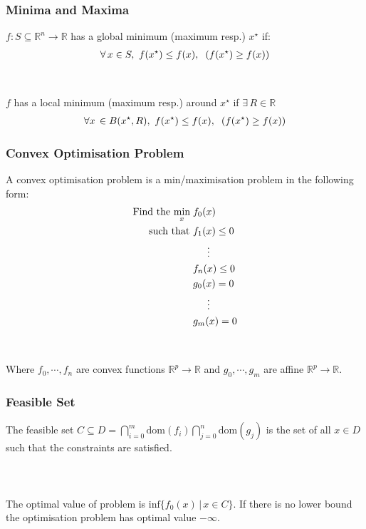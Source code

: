 \documentclass{beamer}
\def\rnum{\mathbb{R}}
\begin{document}
\begin{frame}
    \frametitle{Minima and Maxima}
    $f: S \subseteq \rnum^{n} \rightarrow \rnum$ has a global minimum (maximum
    resp.) $x^{\star}$ if:
    \begin{align*}
        \forall \, x \in S, \, \, f(x^{\star}) \leq f(x), \hspace{2mm}  (f(x^{\star}) \geq f(x))
    \end{align*}
    \\~\\
    $f$ has a local minimum (maximum resp.) around $x^{\star}$ if $\exists \, R \in
     \rnum$ 
    \begin{align*}
        \forall x \, \in B(x^{\star}, R), \, \, f(x^{\star}) \leq f(x),
        \hspace{2mm} (f(x^{\star}) \geq f(x))
    \end{align*}
\end{frame}

\begin{frame}
    \frametitle{Convex Optimisation Problem}
    A convex optimisation problem is a min/maximisation problem in the following
    form:
    {\footnotesize
    \begin{align*}
        \text{Find the }\underset{x}{\text{min}}\; &f_{0}(x) \\
        \text{  such that }&f_{1}(x) \leq 0 \\
        & \hspace{5mm} \vdots \\
        &f_{n}(x) \leq 0 \\
        &g_{0}(x) = 0 \\
        &\hspace{5mm} \vdots \\
        &g_{m}(x) = 0
    \end{align*}}
    \\~\\
    Where $f_0,\cdots, f_n$ are convex functions $\rnum^{p} \rightarrow \rnum$ and $g_0, \cdots, g_m$ are
    affine $\rnum^{p} \rightarrow \rnum$.
\end{frame}

\begin{frame}
    \frametitle{Feasible Set}
    The feasible set $C \subseteq D =
    \bigcap\limits_{i=0}^{m}\text{dom}(f_{i})\bigcap\limits_{j=0}^{n}\text{dom}(g_{j})$
    is the set of all $x \in D$ such that the constraints are satisfied.
    \\~\\
    \\~\\
    The optimal value of problem is $\text{inf} \{f_{0}(x) \, | \, x
    \in C \}$. If there is no lower bound the optimisation problem has optimal
    value $-\infty$.
\end{frame}
\end{document}
